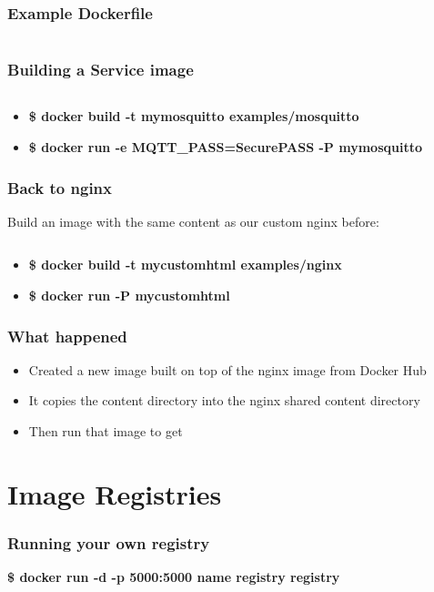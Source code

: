 \documentclass[aspectratio=169,11pt,hyperref={colorlinks=true}]{beamer}
\begin{document}
\begin{frame}
    \frametitle{Example Dockerfile}
    \inputminted[fontsize=\small,breaklines,linenos,frame=single]{dockerfile}{examples/uwsgi/Dockerfile}
\end{frame}

\begin{frame}
    \frametitle{Building a Service image}
    \inputminted[fontsize=\scriptsize,breaklines,linenos,frame=single]{dockerfile}{examples/mosquitto/Dockerfile}
    \begin{itemize}
        \item \textbf{\$ docker build -t mymosquitto examples/mosquitto}
        \item \textbf{\$ docker run -e MQTT\_PASS=SecurePASS -P mymosquitto}
    \end{itemize}
\end{frame}


\begin{frame}
    \frametitle{Back to nginx}
    Build an image with the same content as our custom nginx before:
    \inputminted[fontsize=\large,breaklines,linenos,frame=single]{dockerfile}{examples/nginx/Dockerfile}
    \begin{itemize}
        \item {\large \textbf{\$ docker build -t mycustomhtml examples/nginx}}
        \item {\large \textbf{\$ docker run -P mycustomhtml}}
    \end{itemize}
\end{frame}

\begin{frame}
    \frametitle{What happened}
    \begin{itemize}
        \item Created a new image built on top of the nginx image from Docker Hub
        \item It copies the content directory into the nginx shared content directory
        \item Then run that image to get
    \end{itemize}

\end{frame}


\section{Image Registries}
\begin{frame}
    \frametitle{Running your own registry}
    {\Large \textbf{\$ docker run -d -p 5000:5000 \-\-name registry registry}}
\end{frame}
\end{document}
